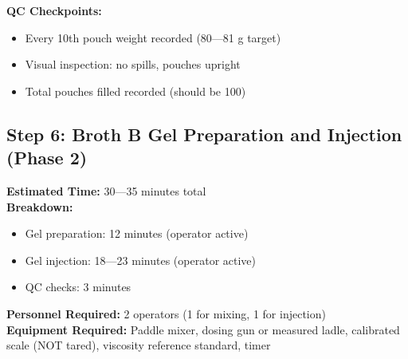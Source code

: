 {\textbf{QC Checkpoints:}
\begin{itemize}
\item Every 10th pouch weight recorded (80---81 g target)
\item Visual inspection: no spills, pouches upright
\item Total pouches filled recorded (should be 100)
\end{itemize}


\clearpage

\subsection*{Step 6: Broth B Gel Preparation and Injection (Phase 2)}

\textbf{Estimated Time:} 30---35 minutes total \\
\textbf{Breakdown:}
\begin{itemize}
\item Gel preparation: 12 minutes (operator active)
\item Gel injection: 18---23 minutes (operator active)
\item QC checks: 3 minutes
\end{itemize}
\textbf{Personnel Required:} 2 operators (1 for mixing, 1 for injection) \\
\textbf{Equipment Required:} Paddle mixer, dosing gun or measured ladle, calibrated scale (NOT tared), viscosity reference standard, timer

\vspace{0.5em}

\vspace{0.5em}

}
